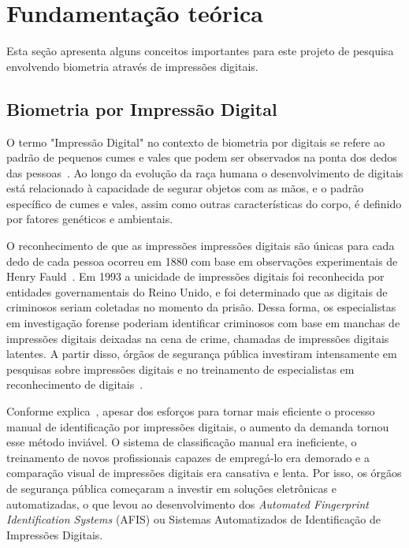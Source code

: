 \section{Fundamentação teórica}\label{sec:fundamentacao_teorica}

Esta seção apresenta alguns conceitos importantes para este projeto de pesquisa envolvendo biometria através de impressões digitais.

\subsection{Biometria por Impressão Digital}\label{subsec:impressoes_digitais}

O termo "Impressão Digital" no contexto de biometria por digitais se refere ao padrão de pequenos cumes e vales que podem ser observados na ponta dos dedos das pessoas~\cite{HandbookOfBiometrics}. Ao longo da evolução da raça humana o desenvolvimento de digitais está relacionado à capacidade de segurar objetos com as mãos, e o padrão específico de cumes e vales, assim como outras características do corpo, é definido por fatores genéticos e ambientais.

O reconhecimento de que as impressões impressões digitais são únicas para cada dedo de cada pessoa ocorreu em 1880 com base em observações experimentais de Henry Fauld~\cite{FingerPrintTechniques}. Em 1993 a unicidade de impressões digitais foi reconhecida por entidades governamentais do Reino Unido, e foi determinado que as digitais de criminosos seriam coletadas no momento da prisão. Dessa forma, os especialistas em investigação forense poderiam identificar criminosos com base em manchas de impressões digitais deixadas na cena de crime, chamadas de impressões digitais latentes. A partir disso, órgãos de segurança pública investiram intensamente em pesquisas sobre impressões digitais e no treinamento de especialistas em reconhecimento de digitais~\cite{FingerPrintMechanics}.

Conforme explica~, apesar dos esforços para tornar mais eficiente o processo manual de identificação por impressões digitais, o aumento da demanda tornou esse método inviável. O sistema de classificação manual era ineficiente, o treinamento de novos profissionais capazes de empregá-lo era demorado e a comparação visual de impressões digitais era cansativa e lenta. Por isso, os órgãos de segurança pública começaram a investir em soluções eletrônicas e automatizadas, o que levou ao desenvolvimento dos \textit{Automated Fingerprint
Identification Systems} (AFIS) ou Sistemas Automatizados de Identificação de Impressões Digitais. 

